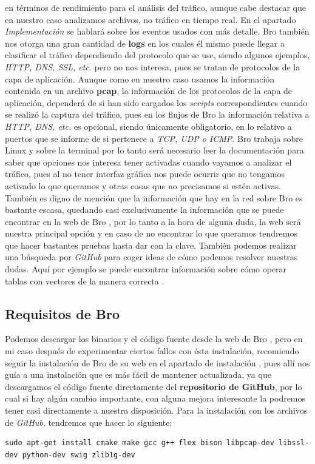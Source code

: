 en términos de rendimiento para el análisis del tráfico, aunque cabe 
destacar que en nuestro caso analizamos archivos, no tráfico en tiempo real. 
En el apartado \textit{Implementación} se hablará sobre los eventos usados con más detalle.
\intro
Bro también nos otorga una gran cantidad de \textbf{logs} en los cuales él mismo puede 
llegar a clasificar el tráfico dependiendo del protocolo que se use, siendo 
algunos ejemplos, \textit{HTTP, DNS, SSL, etc.} pero no nos interesa, pues se tratan de protocolos 
de la capa de aplicación. Aunque como en nuestro caso usamos la información contenida en 
un archivo \textbf{pcap}, la información de los protocolos de la capa de aplicación, 
dependerá de si han sido cargados los \textit{scripts} correspondientes cuando se 
realizó la captura del tráfico, pues en los flujos 
de Bro la información relativa a \textit{HTTP, DNS, etc.} es opcional, siendo únicamente 
obligatorio, en lo relativo a puertos que se informe de si pertenece a \textit{TCP, UDP o ICMP}.
\intro
Bro trabaja sobre Linux y sobre la terminal por lo tanto será necesario leer 
la documentación para saber que opciones nos interesa tener activadas cuando 
vayamos a analizar el tráfico, pues al no tener interfaz gráfica nos puede 
ocurrir que no tengamos activado lo que queramos y otras cosas que no 
precisamos si estén activas.
\intro
También es digno de mención que la información que hay en la red sobre Bro 
es bastante escasa, quedando casi exclusivamente la información que se puede 
encontrar en la web de Bro \cite{broindex}, por lo tanto a la hora de alguna 
duda, la web será nuestra principal opción y en caso de no encontrar lo que 
queramos tendremos que hacer bastantes pruebas hasta dar con la clave. 
También podemos realizar una búsqueda por \textit{GitHub} para coger ideas de cómo 
podemos resolver nuestras dudas. Aquí por ejemplo se puede encontrar información 
sobre cómo operar tablas con vectores de la manera correcta \cite{gitbeacon}.

\subsection{Requisitos de Bro}

Podemos descargar los binarios y el código fuente desde la web de Bro \cite{brodownload}, 
pero en mi caso después de experimentar ciertos fallos con ésta instalación, 
recomiendo seguir la instalación de Bro de su web en el apartado de instalación \cite{broinstall}, 
pues allí nos guía a una instalación que es más fácil de mantener actualizada, 
ya que descargamos el código fuente directamente del \textbf{repositorio de GitHub}, 
por lo cual si hay algún cambio importante, con alguna mejora interesante 
la podremos tener casi directamente a nuestra disposición.
\intro
Para la instalación con los archivos de \textit{GitHub}, tendremos que hacer lo siguiente:
\intro
\begin{lstlisting}[style=Consola]
sudo apt-get install cmake make gcc g++ flex bison libpcap-dev libssl-dev python-dev swig zlib1g-dev
\end{lstlisting}

